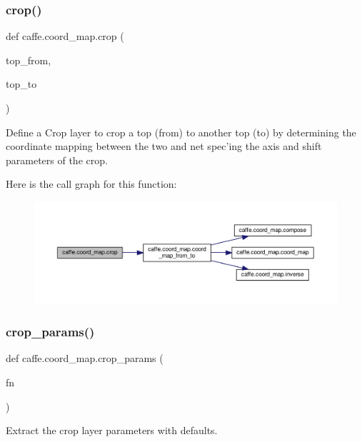 \subsubsection{\texorpdfstring{crop()}{crop()}}
{\footnotesize\ttfamily def caffe.\+coord\+\_\+map.\+crop (\begin{DoxyParamCaption}\item[{}]{top\+\_\+from,  }\item[{}]{top\+\_\+to }\end{DoxyParamCaption})}

\begin{DoxyVerb}Define a Crop layer to crop a top (from) to another top (to) by
determining the coordinate mapping between the two and net spec'ing
the axis and shift parameters of the crop.
\end{DoxyVerb}
 Here is the call graph for this function\+:
\nopagebreak
\begin{figure}[H]
\begin{center}
\leavevmode
\includegraphics[width=350pt]{namespacecaffe_1_1coord__map_aca9f1366a027d686a27d150e054296ee_cgraph}
\end{center}
\end{figure}
\mbox{\label{namespacecaffe_1_1coord__map_ac97591996ede7cfc368c2e472e0d07b6}} 
\subsubsection{\texorpdfstring{crop\+\_\+params()}{crop\_params()}}
{\footnotesize\ttfamily def caffe.\+coord\+\_\+map.\+crop\+\_\+params (\begin{DoxyParamCaption}\item[{}]{fn }\end{DoxyParamCaption})}

\begin{DoxyVerb}Extract the crop layer parameters with defaults.
\end{DoxyVerb}
 \mbox{\label{namespacecaffe_1_1coord__map_ad03646b133a0a44eb1062c6acf677c8c}} 
